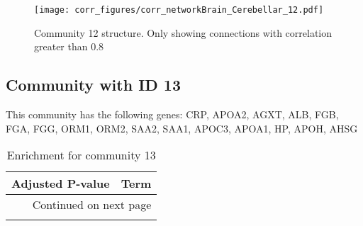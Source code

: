 \begin{figure}[h!]
\centering
\texttt{[image: corr\_figures/corr\_networkBrain\_Cerebellar\_12.pdf]}
\caption{Community 12 structure. Only showing connections with correlation greater than 0.8}
\end{figure}




\subsection*{Community with ID 13}
This community has the following genes: CRP, APOA2, AGXT, ALB, FGB, FGA, FGG, ORM1, ORM2, SAA2, SAA1, APOC3, APOA1, HP, APOH, AHSG
\\
\begin{longtable}{p{2.4cm}p{14.5cm}}
\caption{Enrichment for community 13}\\
\toprule
Adjusted \newline P-value &                                                                                          Term \\
\midrule
\endhead
\midrule
\multicolumn{2}{r}{{Continued on next page}} \\
\midrule
\endfoot


\end{longtable}
